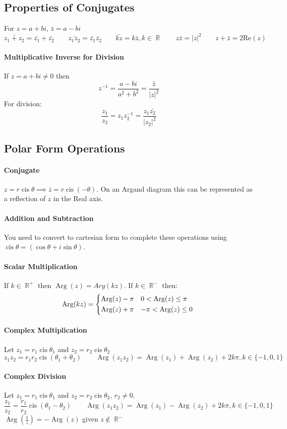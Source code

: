 \documentclass[a4paper,twoside,10pt]{article}
\DeclareMathOperator\cis{cis}
\DeclareMathOperator\Arg{Arg}
\renewcommand{\Re}{\mathrm{Re}}
\DeclareMathOperator\R{\mathbb{R}}
\begin{document}
		\subsection{Properties of Conjugates}
			For $z=a+bi$, $\bar{z}=a-bi$
			\[
				\bar{z_1+z_2}=\bar{z_1}+\bar{z_2} \qquad \bar{z_1z_2}=\bar{z_1}\bar{z_2} \qquad \bar{kz}=k\bar{z},k\in\R \qquad z\bar{z}=|z|^2 \qquad z+\bar{z}=2\Re(z)
			\]
			\paragraph{Multiplicative Inverse for Division} If $z=a+bi\neq0$ then
			\[
				z^{-1}=\frac{a-bi}{a^2+b^2}=\frac{\bar{z}}{|z|^2}
			\]
			For division:
			\[
				\frac{z_1}{z_2}=z_1z_2^{-1}=\frac{z_1\bar{z_2}}{|z_2|^2}
			\]
		\subsection{Polar Form Operations}
			\paragraph{Conjugate} $z=r\cis\theta\implies\bar{z}=r\cis\left(-\theta\right)$. On an Argand diagram this can be represented as a reflection of $z$ in the Real axis.
			\paragraph{Addition and Subtraction} You need to convert to cartesian form to complete these operations using $\cis\theta=(\cos\theta+i\sin\theta)$.
			\paragraph{Scalar Multiplication} If $k\in\R^+$ then $\Arg(z)=Arg(kz)$. If $k\in\R^-$ then:
			\[
				\Arg(kz)=\begin{cases*}
					\Arg(z)-\pi & $0<\Arg(z)\leq\pi$ \\
					\Arg(z)+\pi & $-\pi<\Arg(z)\leq0$
				\end{cases*}
			\]
			\paragraph{Complex Multiplication} Let $z_1=r_1\cis\theta_1$ and $z_2=r_2\cis\theta_2$
			\[
				z_1z_2=r_1r_2\cis(\theta_1+\theta_2) \qquad \Arg(z_1z_2)=\Arg(z_1)+\Arg(z_2)+2k\pi,k\in\{-1,0,1\}
			\]
			\paragraph{Complex Division} Let $z_1=r_1\cis\theta_1$ and $z_2=r_2\cis\theta_2$, $r_2\neq0$.
			\[
				\frac{z_1}{z_2}=\frac{r_1}{r_2}\cis\left(\theta_1-\theta_2\right) \qquad \Arg(z_1z_2)=\Arg(z_1)-\Arg(z_2)+2k\pi,k\in\{-1,0,1\}
			\]
			$\Arg(\frac{1}{z})=-\Arg(z)$ given $z\notin\R^-$
\end{document}
